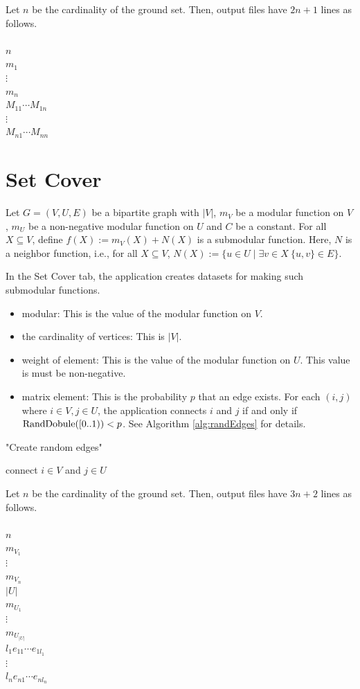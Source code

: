 \documentclass{article}
\newcommand{\randre}{{\rm RandomReal}}
\newcommand{\exTab}[1]{
In the #1 tab,
the application creates datasets for making such submodular functions.}
\newcommand{\out}[1]{
Let $n$ be the cardinality of the ground set.
Then, output files have $#1$ lines as follows.\\ \mbox{}\\
}
\begin{document}
\out{2n+1}
$n$\\
$m_1$ \\
$\vdots$ \\
$m_n$ \\
$M_{11}\cdots M_{1n}$\\
\mbox{\quad \quad}$\vdots$ \\
$M_{n1} \cdots M_{nn}$ \\


\newpage

\section{Set Cover}\label{setCoverSec}
Let $G=(V,U,E)$ be a bipartite graph with $|V|$,
$m_V$ be a modular function on $V$,
$m_U$ be a non-negative modular function on $U$
and $C$ be a constant.
For all $X\subseteq V$,
define $f(X):=m_V(X)+N(X)$ is a submodular function.
Here, $N$ is a neighbor function, i.e.,
for all $X\subseteq V$, $N(X):=\{u \in U \mid \exists v\in X~ \{ u,v\}\in E  \} $.
\exTab{Set Cover}

\begin{itemize}
\item modular: This is the value of the modular function on $V$.
\item the cardinality of vertices: This is $|V|$.
\item weight of element: This is the value of the modular function on $U$.
This value is must be non-negative.
\item matrix element: This is the probability $p$ that an edge exists.
For each $(i,j)$ where $i\in V,j\in U$,
the application connects $i$ and $j$ if and only if ${\rm RandDobule}([0..1))<p$.
See Algorithm \ref{alg:randEdges} for details.
\end{itemize}


\begin{algorithm}[h!]
\fontsize{10pt}{12.0pt}\selectfont
   \caption{"Create random edges"}
   \label{alg:randEdges}
\begin{algorithmic}
   \IF{ $\randre() < p$}	
   \STATE connect $i\in V$ and $j\in U$
   \ENDIF
   \ENDFOR
   \ENDFOR
\end{algorithmic}
\end{algorithm}

\out{3n+2}
$n$\\
$m_{V_{1}}$ \\
$\vdots$ \\
$m_{V_{n}}$ \\
$|U|$ \\
$m_{U_{1}}$ \\
$\vdots$ \\
$m_{U_{|U|}}$ \\
$l_1e_{11}\cdots e_{1l_1}$\\
\mbox{\quad \quad}$\vdots$ \\
$l_ne_{n1} \cdots e_{nl_n}$ \\
\end{document}

